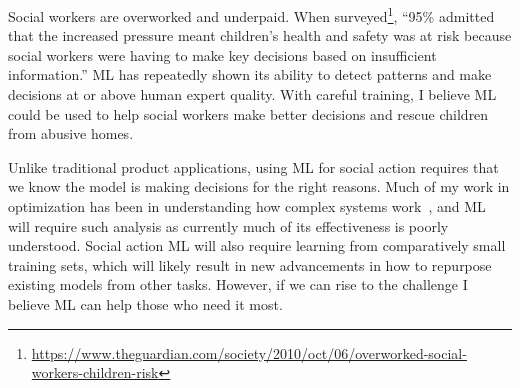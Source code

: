 \documentclass[a4paper, 11pt]{article}
\begin{document}
Social workers are overworked and underpaid. When
surveyed\footnote{\url{https://www.theguardian.com/society/2010/oct/06/overworked-social-workers-children-risk}},
``95\% admitted that the increased pressure meant children's health and safety was at risk because social workers
were having to make key decisions based on insufficient information.'' ML has repeatedly shown
its ability to detect patterns and make decisions at or above human expert quality. With careful
training, I believe ML could be used to help social workers make better decisions and rescue children
from abusive homes.

Unlike traditional product applications, using ML for social action
requires that we know the model is making decisions for the right reasons.
Much of my work in optimization has been in understanding how complex systems work~\cite{goldman:2015:cgpanalysis,goldman:2016:p3hiff},
and ML will require such analysis as currently much of its effectiveness is poorly understood.
Social action ML will also require learning
from comparatively small training sets, which will likely result in new advancements
in how to repurpose existing models from other tasks. However, if we can rise to the challenge
I believe ML can help those who need it most.





\small



\end{document}
